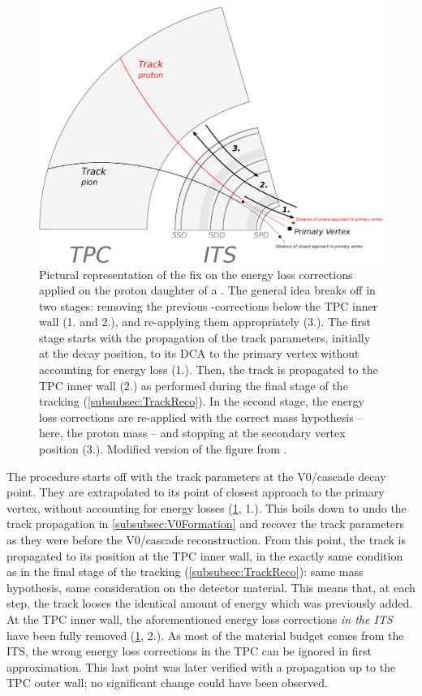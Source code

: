\begin{figure}[t]
	\centering
	\includegraphics[width=1\textwidth]{Figs/Chapter5/Schema-RetroCorrections.eps}
	\caption{Pictural representation of the fix on the energy loss corrections applied on the proton daughter of a \rmLambdaPM. The general idea breaks off in two stages: removing the previous \dEdx-corrections below the TPC inner wall (1. and 2.), and re-applying them appropriately (3.). The first stage starts with the propagation of the track parameters, initially at the decay position, to its DCA to the primary vertex without accounting for energy loss (1.). Then, the track is propagated to the TPC inner wall (2.) as performed during the final stage of the tracking (\Sec\ref{subsubsec:TrackReco}). In the second stage, the energy loss corrections are re-applied with the correct mass hypothesis -- here, the proton mass -- and stopping at the secondary vertex position (3.). Modified version of the figure from \cite{maireTrackReconstructionPrinciple2011}.}
	\label{fig:SchemeRetroCorrection}
\end{figure}

The procedure starts off with the track parameters at the V0/cascade decay point. They are extrapolated to its point of closest approach to the primary vertex, without accounting for energy losses (\fig\ref{fig:SchemeRetroCorrection}, 1.). This boils down to undo the track propagation in \Sec\ref{subsubsec:V0Formation} and recover the track parameters as they were before the V0/cascade reconstruction. From this point, the track is propagated to its position at the TPC inner wall, in the exactly same condition as in the final stage of the tracking (\Sec\ref{subsubsec:TrackReco}): same mass hypothesis, same consideration on the detector material. This means that, at each step, the track looses the identical amount of energy which was previously added. At the TPC inner wall, the aforementioned energy loss corrections \textit{in the ITS} have been fully removed (\fig\ref{fig:SchemeRetroCorrection}, 2.). As most of the material budget comes from the ITS, the wrong energy loss corrections in the TPC can be ignored in first approximation. This last point was later verified with a propagation up to the TPC outer wall; no significant change could have been observed.  

